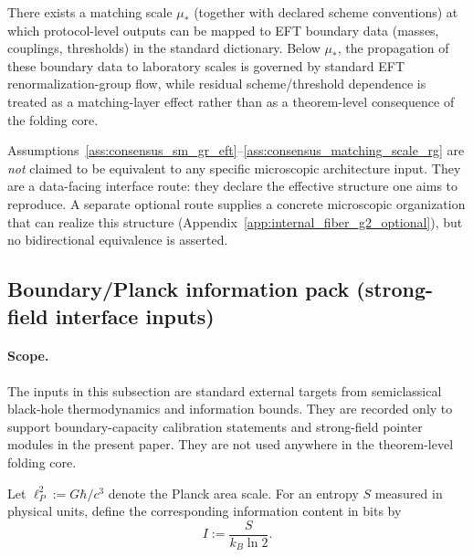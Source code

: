 \begin{assumption}
\label{ass:consensus_matching_scale_rg}
\MatchTag There exists a matching scale $\mu_\ast$ (together with declared scheme conventions) at which protocol-level outputs can be mapped to EFT boundary data (masses, couplings, thresholds) in the standard dictionary.
Below $\mu_\ast$, the propagation of these boundary data to laboratory scales is governed by standard EFT renormalization-group flow, while residual scheme/threshold dependence is treated as a matching-layer effect rather than as a theorem-level consequence of the folding core.
\end{assumption}

\begin{remark}
\AuditTag Assumptions~\ref{ass:consensus_sm_gr_eft}--\ref{ass:consensus_matching_scale_rg} are \emph{not} claimed to be equivalent to any specific microscopic architecture input.
They are a data-facing interface route: they declare the effective structure one aims to reproduce.
A separate optional route supplies a concrete microscopic organization that can realize this structure (Appendix~\ref{app:internal_fiber_g2_optional}), but no bidirectional equivalence is asserted.
\end{remark}

\subsection{Boundary/Planck information pack (strong-field interface inputs)}
\label{subsec:pphys_bh_planck_pack}

\paragraph{Scope.}
\AuditTag The inputs in this subsection are standard external targets from semiclassical black-hole thermodynamics and information bounds.
They are recorded only to support boundary-capacity calibration statements and strong-field pointer modules in the present paper.
They are not used anywhere in the theorem-level folding core.

\begin{assumption}
\label{ass:bh_planck_units_info}
\MatchTag Let $\ell_P^2:=G\hbar/c^3$ denote the Planck area scale.
For an entropy $S$ measured in physical units, define the corresponding information content in bits by
\[
I:=\frac{S}{k_B\ln 2}.
\]
\end{assumption}

